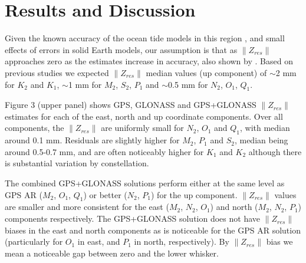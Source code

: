 \documentclass[se, manuscript]{copernicus}
\begin{document}
\section{Results and Discussion}

Given the known accuracy of the ocean tide models in this region \citep{Penna2015}, and small effects of errors in solid Earth models, our assumption is that as $\|Z_{res}\|$ approaches zero as the estimates increase in accuracy, also shown by \cite{Bos2015}. Based on previous studies \citep[e.g.,][]{Yuan2013} we expected $\|Z_{res}\|$ median values (up component) of $\sim$2 mm for $K_2$ and $K_1$, $\sim$1 mm for $M_2$, $S_2$, $P_1$ and $\sim$0.5 mm for $N_2$, $O_1$, $Q_1$. 

Figure 3 (upper panel) shows GPS, GLONASS and GPS+GLONASS $\|Z_{res}\|$ estimates for each of the east, north and up coordinate components. Over all components, the $\|Z_{res}\|$ are uniformly small for $N_2$, $O_1$ and $Q_1$, with median around 0.1 mm. Residuals are slightly higher for $M_2$, $P_1$ and $S_2$, median being around 0.5-0.7 mm, and are often noticeably higher for $K_1$ and $K_2$ although there is substantial variation by constellation.

The combined GPS+GLONASS solutions perform either at the same level as GPS AR ($M_2$, $O_1$, $Q_1$) or better ($N_2$, $P_1$) for the up component. $\|Z_{res}\|$ values are smaller and more consistent for the east ($M_2$, $N_2$, $O_1$) and north ($M_2$, $N_2$, $P_1$) components respectively. The GPS+GLONASS solution does not have $\|Z_{res}\|$ biases in the east and north components as is noticeable for the GPS AR solution (particularly for $O_1$ in east, and $P_1$ in north, respectively). By $\|Z_{res}\|$ bias we mean a noticeable gap between zero and the lower whisker. 
\end{document}
